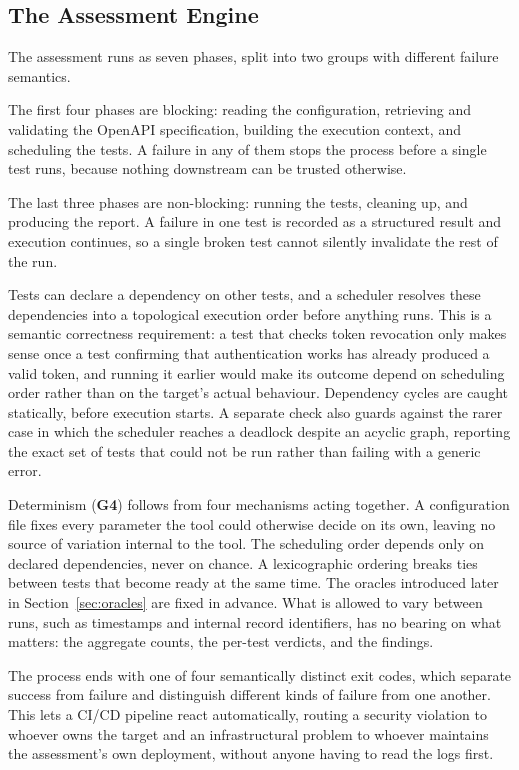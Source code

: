 \subsection{The Assessment Engine}
\label{sec:engine}

The assessment runs as seven phases, split into two groups with different failure semantics.

The first four phases are blocking: reading the configuration, retrieving and validating the OpenAPI specification, building the execution context, and scheduling the tests.
A failure in any of them stops the process before a single test runs, because nothing downstream can be trusted otherwise.

The last three phases are non-blocking: running the tests, cleaning up, and producing the report.
A failure in one test is recorded as a structured result and execution continues, so a single broken test cannot silently invalidate the rest of the run.

Tests can declare a dependency on other tests, and a scheduler resolves these dependencies into a topological execution order before anything runs.
This is a semantic correctness requirement: a test that checks token revocation only makes sense once a test confirming that authentication works has already produced a valid token, and running it earlier would make its outcome depend on scheduling order rather than on the target's actual behaviour.
Dependency cycles are caught statically, before execution starts.
A separate check also guards against the rarer case in which the scheduler reaches a deadlock despite an acyclic graph, reporting the exact set of tests that could not be run rather than failing with a generic error.

Determinism (\textbf{G4}) follows from four mechanisms acting together.
A configuration file fixes every parameter the tool could otherwise decide on its own, leaving no source of variation internal to the tool.
The scheduling order depends only on declared dependencies, never on chance.
A lexicographic ordering breaks ties between tests that become ready at the same time.
The oracles introduced later in Section~\ref{sec:oracles} are fixed in advance.
What is allowed to vary between runs, such as timestamps and internal record identifiers, has no bearing on what matters: the aggregate counts, the per-test verdicts, and the findings.

The process ends with one of four semantically distinct exit codes, which separate success from failure and distinguish different kinds of failure from one another.
This lets a CI/CD pipeline react automatically, routing a security violation to whoever owns the target and an infrastructural problem to whoever maintains the assessment's own deployment, without anyone having to read the logs first.


